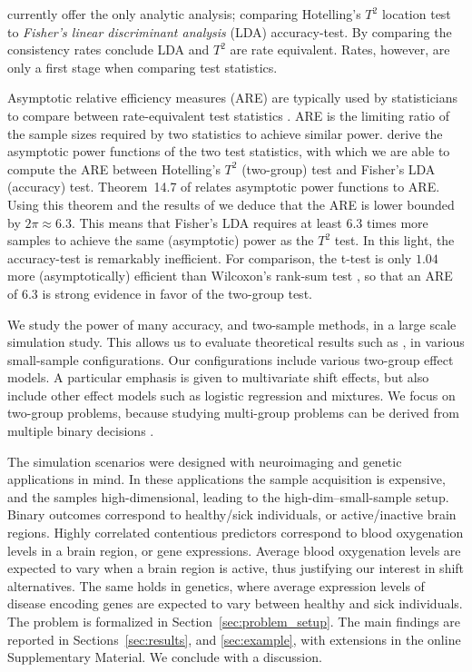 \documentclass[oupdraft]{bio}
\begin{document}
\cite{ramdas_classification_2016} currently offer the only analytic analysis; comparing Hotelling's $T^2$ location test to \emph{Fisher's linear discriminant analysis} (LDA) accuracy-test. 
By comparing the consistency rates \cite{ramdas_classification_2016} conclude LDA and $T^2$ are rate equivalent.
Rates, however, are only a first stage when comparing test statistics. 

Asymptotic relative efficiency measures (ARE) are typically used by statisticians to compare between rate-equivalent test statistics \citep{vaart_asymptotic_1998}.
ARE is the limiting ratio of the sample sizes required by two statistics to achieve similar power. 
\citet{ramdas_classification_2016} derive the asymptotic power functions of the two test statistics, with which we are able to compute the ARE between Hotelling's $T^2$ (two-group) test and Fisher's LDA (accuracy) test.
Theorem~14.7 of \cite{vaart_asymptotic_1998} relates asymptotic power functions to ARE.
Using this theorem and the results of \cite{ramdas_classification_2016} we deduce that the ARE is lower bounded by $2 \pi \approx 6.3$.
This means that Fisher's LDA requires at least $6.3$ times more samples to achieve the same (asymptotic) power as the $T^2$ test. 
In this light, the accuracy-test is remarkably inefficient.  
For comparison, the t-test is only $1.04$ more (asymptotically) efficient than Wilcoxon's rank-sum test \citep{lehmann_parametric_2009}, so that an ARE of $6.3$ is strong evidence in favor of the two-group test. 

We study the power of many accuracy, and two-sample methods, in a large scale simulation study. 
This allows us to evaluate theoretical results such as \citet{ramdas_classification_2016}, in various small-sample configurations.
Our configurations include various two-group effect models. 
A particular emphasis is given to multivariate shift effects, but also include other effect models such as logistic regression and  mixtures. 
We focus on two-group problems, because studying multi-group problems can be derived from multiple binary decisions \citep{zheng2018extrapolating}.

The simulation scenarios were designed with neuroimaging and genetic applications in mind. 
In these applications the sample acquisition is expensive, and the samples high-dimensional, leading to the high-dim--small-sample setup.
Binary outcomes correspond to healthy/sick individuals, or active/inactive brain regions.
Highly correlated contentious predictors correspond to blood oxygenation levels in a brain region, or gene expressions.
Average blood oxygenation levels are expected to vary when a brain region is active, thus justifying our interest in shift alternatives. 
The same holds in genetics, where average expression levels of disease encoding genes are expected to vary between healthy and sick individuals. 
The problem is formalized in Section~\ref{sec:problem_setup}.
The main findings are reported in Sections~\ref{sec:results}, and \ref{sec:example}, with extensions in the online Supplementary Material. 
We conclude with a discussion.
\end{document}
